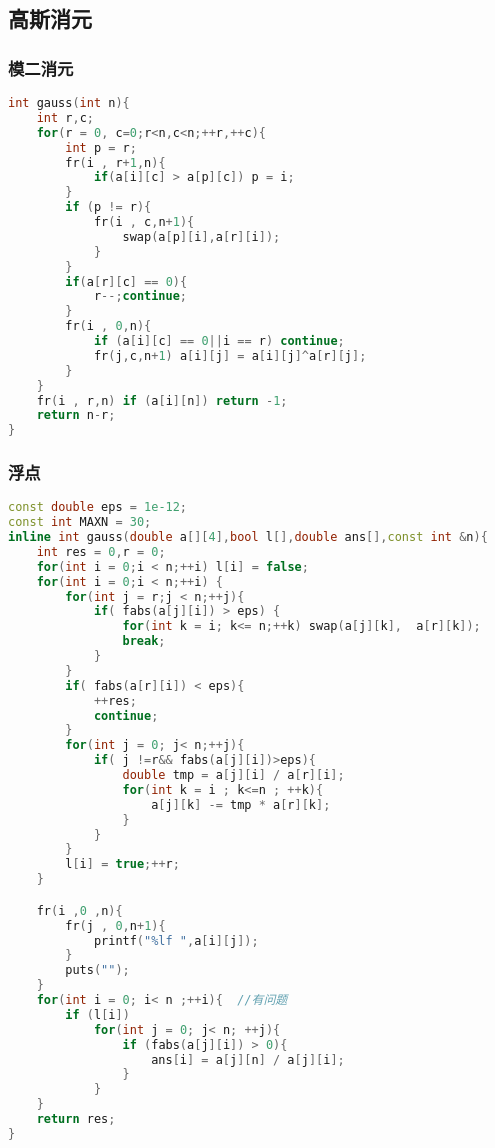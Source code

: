 \subsection{高斯消元}
	\subsubsection{模二消元}
		\begin{lstlisting}[language=c++]
int gauss(int n){
	int r,c;
	for(r = 0, c=0;r<n,c<n;++r,++c){
		int p = r;
		fr(i , r+1,n){
			if(a[i][c] > a[p][c]) p = i;
		}
		if (p != r){
			fr(i , c,n+1){
				swap(a[p][i],a[r][i]);
			}
		}
		if(a[r][c] == 0){
			r--;continue;
		}
		fr(i , 0,n){
			if (a[i][c] == 0||i == r) continue;
			fr(j,c,n+1) a[i][j] = a[i][j]^a[r][j];
		}
	}
	fr(i , r,n) if (a[i][n]) return -1;
	return n-r;
}
		\end{lstlisting}
	\subsubsection{浮点}
		\begin{lstlisting}[language=c++]
const double eps = 1e-12;
const int MAXN = 30;
inline int gauss(double a[][4],bool l[],double ans[],const int &n){
    int res = 0,r = 0;
    for(int i = 0;i < n;++i) l[i] = false;
    for(int i = 0;i < n;++i) {
        for(int j = r;j < n;++j){
            if( fabs(a[j][i]) > eps) {
                for(int k = i; k<= n;++k) swap(a[j][k],  a[r][k]);
                break;
            }
        }
        if( fabs(a[r][i]) < eps){
            ++res;
            continue;
        }
        for(int j = 0; j< n;++j){
            if( j !=r&& fabs(a[j][i])>eps){
                double tmp = a[j][i] / a[r][i];
                for(int k = i ; k<=n ; ++k){
                    a[j][k] -= tmp * a[r][k];
                }
            }
        }
        l[i] = true;++r;
    }

    fr(i ,0 ,n){
        fr(j , 0,n+1){
            printf("%lf ",a[i][j]);
        }
        puts("");
    }
    for(int i = 0; i< n ;++i){  //有问题
        if (l[i])
            for(int j = 0; j< n; ++j){
                if (fabs(a[j][i]) > 0){
                    ans[i] = a[j][n] / a[j][i];
                }
            }
    }
    return res;
}
		\end{lstlisting}